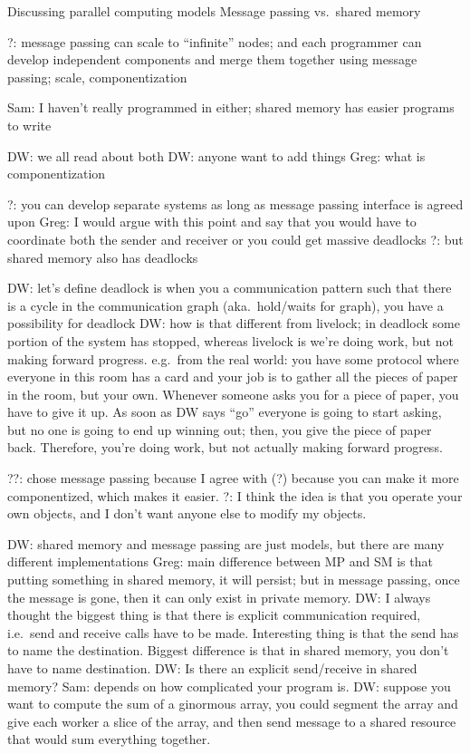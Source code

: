 



Discussing parallel computing models
Message passing vs.\ shared memory

?: message passing can scale to ``infinite'' nodes; and each programmer can develop independent components and merge them together using message passing; scale, componentization

Sam: I haven't really programmed in either; shared memory has easier programs to write

DW: we all read about both
DW: anyone want to add things
Greg: what is componentization

?: you can develop separate systems as long as message passing interface is agreed upon
Greg: I would argue with this point and say that you would have to coordinate both the sender and receiver or you could get massive deadlocks
?: but shared memory also has deadlocks

DW: let's define deadlock is when you a communication pattern such that there is a cycle in the communication graph (aka.\ hold/waits for graph), you have a possibility for deadlock
DW: how is that different from livelock; in deadlock some portion of the system has stopped, whereas livelock is we're doing work, but not making forward progress. e.g.\ from the real world: you have some protocol where everyone in this room has a card and your job is to gather all the pieces of paper in the room, but your own. Whenever someone asks you for a piece of paper, you have to give it up. As soon as DW says ``go'' everyone is going to start asking, but no one is going to end up winning out; then, you give the piece of paper back. Therefore, you're doing work, but not actually making forward progress.

??: chose message passing because I agree with (?) because you can make it more componentized, which makes it easier.
?: I think the idea is that you operate your own objects, and I don't want anyone else to modify my objects.

DW: shared memory and message passing are just models, but there are many different implementations
Greg: main difference between MP and SM is that putting something in shared memory, it will persist; but in message passing, once the message is gone, then it can only exist in private memory.
DW: I always thought the biggest thing is that there is explicit communication required, i.e.\ send and receive calls have to be made.
Interesting thing is that the send has to name the destination.
Biggest difference is that in shared memory, you don't have to name destination.
DW: Is there an explicit send/receive in shared memory?
Sam: depends on how complicated your program is.
DW: suppose you want to compute the sum of a ginormous array, you could segment the array and give each worker a slice of the array, and then send message to a shared resource that would sum everything together.

